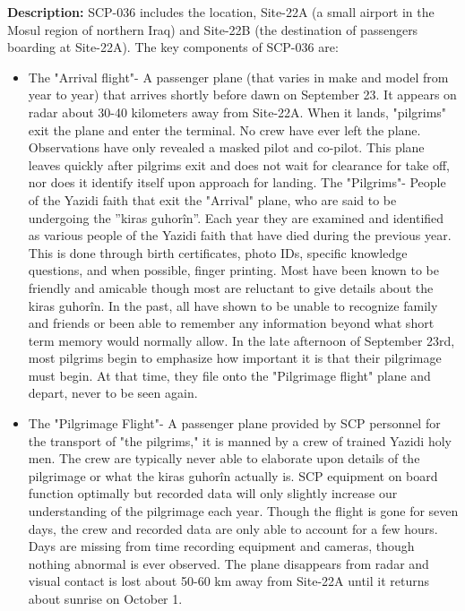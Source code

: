 \textbf{Description:} SCP-036 includes the location, Site-22A (a small airport in the Mosul region of northern Iraq) and Site-22B (the destination of passengers boarding at Site-22A). The key components of SCP-036 are:
\begin{itemize}
\item The "Arrival flight"- A passenger plane (that varies in make and model from year to year) that arrives shortly before dawn on September 23. It appears on radar about 30-40 kilometers away from Site-22A. When it lands, "pilgrims" exit the plane and enter the terminal. No crew have ever left the plane. Observations have only revealed a masked pilot and co-pilot. This plane leaves quickly after pilgrims exit and does not wait for clearance for take off, nor does it identify itself upon approach for landing.
The "Pilgrims"- People of the Yazidi faith that exit the "Arrival" plane, who are said to be undergoing the ''kiras guhor\^{i}n''. Each year they are examined and identified as various people of the Yazidi faith that have died during the previous year. This is done through birth certificates, photo IDs, specific knowledge questions, and when possible, finger printing. Most have been known to be friendly and amicable though most are reluctant to give details about the kiras guhor\^{i}n. In the past, all have shown to be unable to recognize family and friends or been able to remember any information beyond what short term memory would normally allow. In the late afternoon of September 23rd, most pilgrims begin to emphasize how important it is that their pilgrimage must begin. At that time, they file onto the "Pilgrimage flight" plane and depart, never to be seen again.
\item The "Pilgrimage Flight"- A passenger plane provided by SCP personnel for the transport of "the pilgrims," it is manned by a crew of trained Yazidi holy men. The crew are typically never able to elaborate upon details of the pilgrimage or what the kiras guhor\^{i}n actually is. SCP equipment on board function optimally but recorded data will only slightly increase our understanding of the pilgrimage each year. Though the flight is gone for seven days, the crew and recorded data are only able to account for a few hours. Days are missing from time recording equipment and cameras, though nothing abnormal is ever observed. The plane disappears from radar and visual contact is lost about 50-60 km away from Site-22A until it returns about sunrise on October 1.

\end{itemize}
